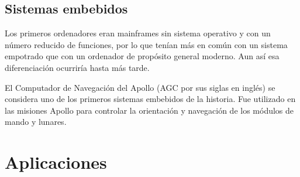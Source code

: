\subsection{Sistemas embebidos}


Los primeros ordenadores eran mainframes sin sistema operativo y con un número reducido de funciones, por lo que tenían más en común con un sistema empotrado que con un ordenador de propósito general moderno. Aun así esa diferenciación ocurriría hasta más tarde.

El Computador de Navegación del Apollo (AGC por sus siglas en inglés) se considera uno de los primeros sistemas embebidos de la historia. Fue utilizado en las misiones Apollo para controlar la orientación y navegación de los módulos de mando y lunares.

\section{Aplicaciones}


